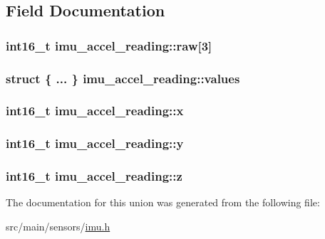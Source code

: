 \subsection{Field Documentation}
\hypertarget{unionimu__accel__reading_af2fa3ca97b1c0128041a0995b4f03a55}{
\subsubsection[{raw}]{\setlength{\rightskip}{0pt plus 5cm}int16\+\_\+t imu\+\_\+accel\+\_\+reading\+::raw\mbox{[}3\mbox{]}}}\label{unionimu__accel__reading_af2fa3ca97b1c0128041a0995b4f03a55}
\hypertarget{unionimu__accel__reading_a305b8c3cad9bae0cef2e382b6ba77b1a}{
\subsubsection[{values}]{\setlength{\rightskip}{0pt plus 5cm}struct \{ ... \}   imu\+\_\+accel\+\_\+reading\+::values}}\label{unionimu__accel__reading_a305b8c3cad9bae0cef2e382b6ba77b1a}
\hypertarget{unionimu__accel__reading_a410f30773523e81621eb5239b2179802}{
\subsubsection[{x}]{\setlength{\rightskip}{0pt plus 5cm}int16\+\_\+t imu\+\_\+accel\+\_\+reading\+::x}}\label{unionimu__accel__reading_a410f30773523e81621eb5239b2179802}
\hypertarget{unionimu__accel__reading_af2b80bdf824780e1bb0c09254d4549f7}{
\subsubsection[{y}]{\setlength{\rightskip}{0pt plus 5cm}int16\+\_\+t imu\+\_\+accel\+\_\+reading\+::y}}\label{unionimu__accel__reading_af2b80bdf824780e1bb0c09254d4549f7}
\hypertarget{unionimu__accel__reading_aba2563f1a7d3e3ca745b21ffecb10429}{
\subsubsection[{z}]{\setlength{\rightskip}{0pt plus 5cm}int16\+\_\+t imu\+\_\+accel\+\_\+reading\+::z}}\label{unionimu__accel__reading_aba2563f1a7d3e3ca745b21ffecb10429}


The documentation for this union was generated from the following file\+:\begin{DoxyCompactItemize}
\item 
src/main/sensors/\hyperlink{sensors_2imu_8h}{imu.\+h}\end{DoxyCompactItemize}
